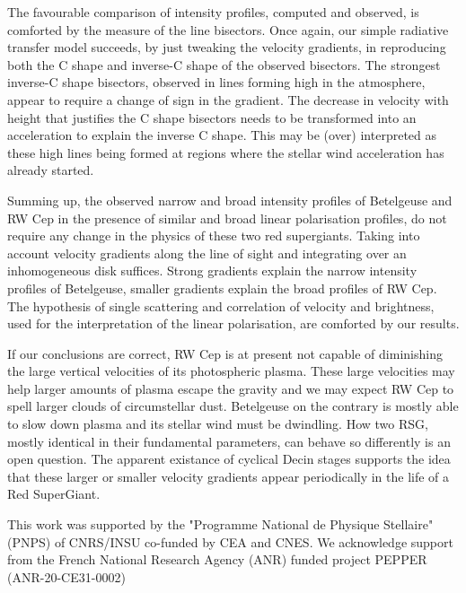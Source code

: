 \documentclass{/Users/art2/TeX/aanda/aa}
\begin{document}
The favourable comparison of intensity profiles, computed and observed, is comforted by the measure of the line bisectors. Once again, our simple radiative 
transfer model succeeds, by just tweaking the velocity gradients, in reproducing both the C shape and inverse-C shape of the observed bisectors. The 
strongest inverse-C shape bisectors, observed in lines forming high in the atmosphere, appear to require a change of sign in the gradient. The decrease 
in velocity with height that justifies the C shape bisectors needs to be transformed into an acceleration to explain the inverse C shape. This may 
be (over) interpreted as these high lines being formed at regions where the stellar wind acceleration has already started.  

Summing up, the observed  narrow and broad intensity profiles of Betelgeuse and RW Cep in the presence of similar and broad linear polarisation 
profiles, do not require any change in the physics of these two red supergiants. Taking into account velocity gradients along the line of sight 
and integrating over an inhomogeneous disk suffices. Strong gradients explain the narrow intensity profiles of Betelgeuse, smaller gradients explain 
the broad profiles of RW Cep. The hypothesis of single scattering and correlation of velocity and brightness, used for the interpretation of the 
linear polarisation, are comforted by our results.

If our conclusions are correct, RW Cep is at present not capable of diminishing the large vertical velocities of its photospheric plasma. These large 
velocities may help larger amounts of plasma escape the gravity and we may expect RW Cep to spell larger clouds of circumstellar dust. Betelgeuse on the 
contrary is mostly able to slow down plasma and its stellar wind must be dwindling. How two RSG, mostly identical in their fundamental parameters, can 
behave so differently is an open question. The apparent existance of cyclical Decin stages \citep{decin_probing_2006,lopez_ariste_height_2023} supports the idea that these larger or smaller velocity 
gradients appear periodically in the life of a Red SuperGiant.




\begin{acknowledgements}
This work was supported by the "Programme National de Physique Stellaire" (PNPS) of CNRS/INSU co-funded by CEA and CNES.
We acknowledge support from the French National Research Agency (ANR)
funded project PEPPER (ANR-20-CE31-0002)
\end{acknowledgements}


%



 
\end{document}
